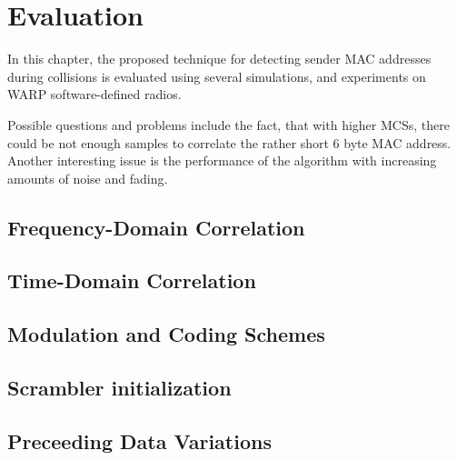 
\chapter{Evaluation}\label{ch:evaluation}
\glsresetall %

In this chapter, the proposed technique for detecting sender MAC addresses during collisions is evaluated using several simulations, and experiments on WARP software-defined radios.

Possible questions and problems include the fact, that with higher \glspl{MCS}, there could be not enough samples to correlate the rather short 6 byte MAC address. Another interesting issue is the performance of the algorithm with increasing amounts of noise and fading.



\section{Frequency-Domain Correlation}



\section{Time-Domain Correlation}\label{sec:freqd-correlation}



\section{Modulation and Coding Schemes}



\section{Scrambler initialization}\label{sec:ex-scrambler}



\section{Preceeding Data Variations}


